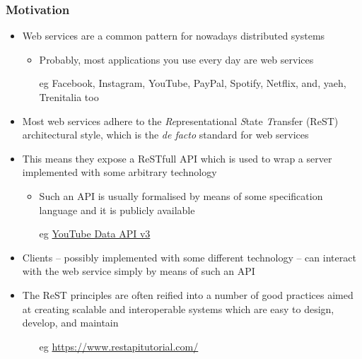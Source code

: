 \documentclass[presentation]{beamer}\mode<presentation>{\usetheme{AMSCesenaPurpleAndGold}}
\begin{document}
\begin{frame}[allowframebreaks]
\frametitle{Motivation}

\begin{itemize}
    \item \alert{Web services} are a common pattern for nowadays distributed systems
    \begin{itemize}
        \item Probably, most applications you use every day are web services
        \item[eg] Facebook, Instagram, YouTube, PayPal, Spotify, Netflix, and, yaeh, \alert{Trenitalia} too
    \end{itemize}
    
    \vspace{.3cm}

    \item Most web services adhere to the \alert{\emph{Re}presentational \emph{S}tate \emph{T}ransfer} (ReST) architectural style, which is the \emph{de facto} standard for web services
    
    \vspace{.3cm} 

    \item This means they expose a \alert{ReSTfull API} which is used to wrap a server implemented with some arbitrary technology
    \begin{itemize}
        \item Such an API is usually formalised by means of some \alert{specification language} and it is publicly available
        
        \item[eg] \href{https://developers.google.com/apis-explorer/\#p/youtube/v3}{YouTube Data API v3}
    \end{itemize}

    \framebreak

    \item Clients -- possibly implemented with some different technology -- can interact with the web service simply by means of such an API

    \vspace{.3cm}

    \item The ReST principles are often reified into a number of good practices aimed at creating \alert{scalable} and \alert{interoperable} systems which are easy to design, develop, and maintain
    \begin{itemize}
        \item[eg] \url{https://www.restapitutorial.com/}
    \end{itemize}
\end{itemize}
\end{frame}
\end{document}
